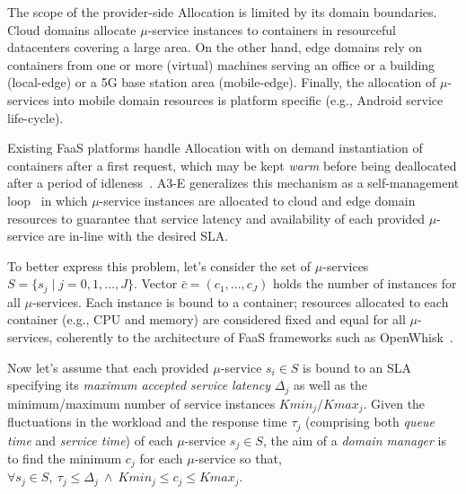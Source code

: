 The scope of the provider-side Allocation is limited by its domain boundaries. Cloud domains allocate $\mu$-service instances to containers in resourceful datacenters covering a large area. On the other hand, edge domains rely on containers from one or more (virtual) machines serving an office or a building (local-edge) or a 5G base station area (mobile-edge). Finally, the allocation of $\mu$-services into mobile domain resources is platform specific (e.g., Android service life-cycle).



Existing FaaS platforms handle Allocation with on demand instantiation of containers after a first request, which may be kept \textit{warm} before being deallocated after a period of idleness~\cite{AWSLambda, OpenWhisk}. A3-E generalizes this mechanism as a self-management loop~\cite{kephart2003vision}
in which $\mu$-service instances are allocated to cloud and edge domain resources to guarantee that service latency and availability of each provided $\mu$-service are in-line with the desired SLA. 

To better express this problem, let's consider the set of $\mu$-services $S = \{s_j \mid j = 0,1,...,J\}$.
Vector $\bar{c} = (c_1, ..., c_J)$ holds the number of instances for all $\mu$-services. Each instance is bound to a container; resources allocated to each container 
(e.g., CPU and memory) are considered fixed and equal for all $\mu$-services, coherently to the architecture of FaaS frameworks such as OpenWhisk~\cite{OpenWhisk}.

Now let's assume that each provided $\mu$-service $s_i \in S$ is bound to an SLA specifying its \textit{maximum accepted service latency} $\Delta_j$ 
as well as the minimum/maximum number of service instances $Kmin_{j}/Kmax_{j}$. %
Given the fluctuations in the workload and the response time $\tau_j$ (comprising both \textit{queue time} and \textit{service time}) of each $\mu$-service $s_j \in S$, the aim of a \textit{domain manager} is to find the minimum $c_j$ for each $\mu$-service so that, $\forall s_j \in S,\ \tau_j \le \Delta_j\ \wedge\ Kmin_j \le c_j \le Kmax_j$. 

